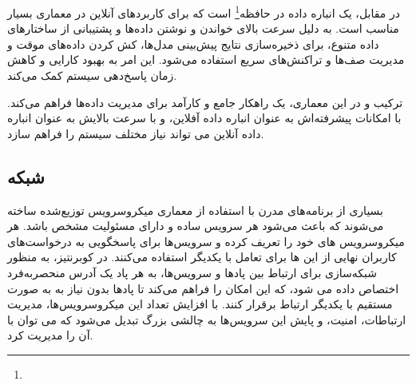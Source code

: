 در مقابل،  یک انباره داده در حافظه\footnote{} است که برای کاربردهای آنلاین در معماری  بسیار مناسب است.  به دلیل سرعت بالای خواندن و نوشتن داده‌ها و پشتیبانی از ساختارهای داده متنوع، برای ذخیره‌سازی نتایج پیش‌بینی مدل‌ها، کش کردن داده‌های موقت و مدیریت صف‌ها و تراکنش‌های سریع استفاده می‌شود. این امر به بهبود کارایی و کاهش زمان پاسخ‌دهی سیستم کمک می‌کند.

ترکیب  و  در این معماری، یک راهکار جامع و کارآمد برای مدیریت داده‌ها فراهم می‌کند.  با امکانات پیشرفته‌اش به عنوان انباره داده آفلاین، و  با سرعت بالایش به عنوان انباره داده آنلاین می تواند نیاز مختلف سیستم را فراهم سازد.

\subsection{شبکه}
بسیاری از برنامه‌های مدرن با استفاده از معماری میکروسرویس توزیع‌شده ساخته می‌شوند که باعث می‌شود هر سرویس ساده و دارای مسئولیت مشخص باشد. هر میکروسرویس های خود را تعریف کرده و سرویس‌ها برای پاسخگویی به درخواست‌های کاربران نهایی از این ها برای تعامل با یکدیگر استفاده می‌کنند. در کوبرنتیز، به منظور شبکه‌سازی برای ارتباط بین پادها و سرویس‌ها، به هر پاد یک آدرس  منحصربه‌فرد اختصاص داده می شود، که این امکان را فراهم می‌کند تا پادها بدون نیاز به  به صورت مستقیم با یکدیگر ارتباط برقرار کنند. با افزایش تعداد این میکروسرویس‌ها، مدیریت ارتباطات، امنیت، و پایش این سرویس‌ها به چالشی بزرگ تبدیل می‌شود که می توان با  آن را مدیریت کرد.


